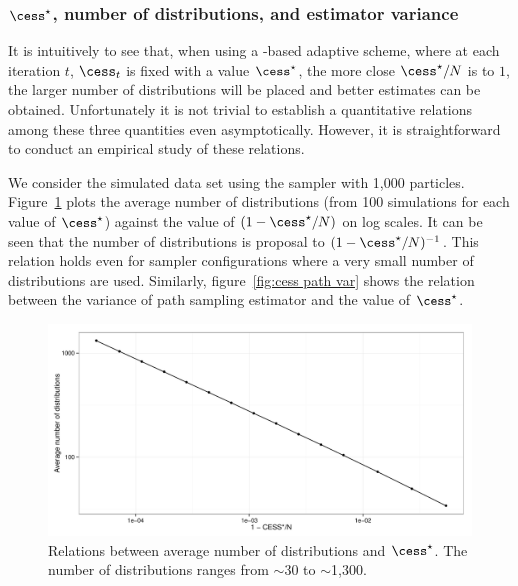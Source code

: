 \subsubsection[cess*, number of distributions, and estimator variance]
{$\cess^\star$, number of distributions, and estimator variance}
\label{ssub:cess*, number of distributions, and estimator variance}

It is intuitively to see that, when using a \cess-based adaptive scheme, where
at each iteration $t$, $\cess_t$ is fixed with a value $\cess^\star$, the more
close $\cess^\star/N$ is to $1$, the larger number of distributions will be placed
and better estimates can be obtained. Unfortunately it is not trivial to
establish a quantitative relations among these three quantities even
asymptotically. However, it is straightforward to conduct an empirical study
of these relations.

We consider the simulated \pet data set using the \smc[2] sampler with 1,000
particles. Figure~\ref{fig:cess iter mean} plots the average number of
distributions (from 100 simulations for each value of $\cess^\star$) against the
value of $(1 - \cess^\star/N)$ on log scales. It can be seen that the number of
distributions is proposal to $(1 - \cess^\star/N)^{-1}$. This relation holds even
for sampler configurations where a very small number of distributions are
used. Similarly, figure~\ref{fig:cess path var} shows the relation between
the variance of path sampling estimator and the value of $\cess^\star$.

\begin{figure}[t]
  \includegraphics[width=\linewidth]{fig/CESS_Iter_Mean}
  \caption{Relations between average number of distributions and
    $\cess^\star$. The number of distributions ranges from $\sim$30 to
    $\sim$1,300.}
  \label{fig:cess iter mean}
\end{figure}

